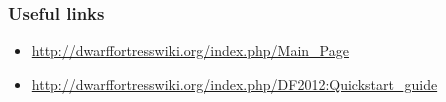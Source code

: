 \begin{frame}
\frametitle{Useful links}
\begin{itemize}
\item \url{http://dwarffortresswiki.org/index.php/Main_Page}
\item \url{http://dwarffortresswiki.org/index.php/DF2012:Quickstart_guide}
\end{itemize}
\end{frame}
